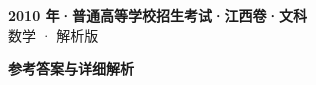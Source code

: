 \documentclass[zihao=-4, a4paper]{ctexart}
\begin{document}
\begin{center}
  {\Large\bfseries 2010 年·普通高等学校招生考试·江西卷·文科}\\[4pt]
  {\large 数学 · 解析版}
\end{center}
\medskip
{}

\clearpage
{}
\begin{center}{\Large\bfseries 参考答案与详细解析}\end{center}
\medskip

\end{document}
